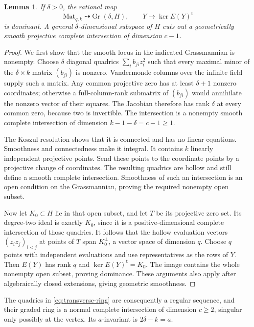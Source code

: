 \documentclass[11pt]{article}
\newtheorem{lemma}[theorem]{Lemma}
\theoremstyle{definition}
\theoremstyle{remark}
\numberwithin{equation}{section}
\DeclareMathOperator{\Mat}{Mat}
\DeclareMathOperator{\Gr}{Gr}
\begin{document}
\begin{lemma}\label{lem:dominance}
If $\delta>0$, the rational map
\[
 \Mat_{q,k}\dashrightarrow\Gr(\delta,H),\qquad
 Y\longmapsto\ker E(Y)^{\mathsf t}
\]
is dominant. A general $\delta$-dimensional subspace of $H$ cuts
out a geometrically smooth projective complete intersection of
dimension $c-1$.
\end{lemma}

\begin{proof}
We first show that the smooth locus in the indicated Grassmannian
is nonempty. Choose $\delta$ diagonal quadrics
$\sum_i b_{ji}z_i^2$ such that every maximal minor of the
$\delta\times k$ matrix $(b_{ji})$ is nonzero. Vandermonde columns
over the infinite field supply such a matrix. Any common projective
zero has at least $\delta+1$ nonzero coordinates; otherwise a
full-column-rank submatrix of $(b_{ji})$ would annihilate the nonzero
vector of their squares. The Jacobian therefore has rank $\delta$
at every common zero, because two is invertible. The intersection
is a nonempty smooth complete intersection of dimension
$k-1-\delta=c-1\geq1$.

The Koszul resolution shows that it is connected and has no linear
equations. Smoothness and connectedness make it integral. It contains
$k$ linearly independent projective points. Send these points to the
coordinate points by a projective change of coordinates. The resulting
quadrics are hollow and still define a smooth complete intersection.
Smoothness of such an intersection is an open condition on the
Grassmannian, proving the required nonempty open subset.

Now let $K_0\subset H$ lie in that open subset, and let $T$ be its
projective zero set. Its degree-two ideal is exactly $K_0$, since
it is a positive-dimensional complete intersection of those quadrics.
It follows that the hollow evaluation vectors
$(z_i z_j)_{i<j}$ at points of $T$ span $K_0^\perp$, a vector space
of dimension $q$. Choose $q$ points with independent evaluations
and use representatives as the rows of $Y$. Then $E(Y)$ has rank
$q$ and $\ker E(Y)^{\mathsf t}=K_0$. The image contains the whole
nonempty open subset, proving dominance. These arguments also apply
after algebraically closed extensions, giving geometric smoothness.
\end{proof}

The quadrics in \eqref{eq:transverse-ring} are consequently a regular
sequence, and their graded ring is a normal complete intersection
of dimension $c\geq2$, singular only possibly at the vertex. Its
$a$-invariant is $2\delta-k=a$.
\end{document}
